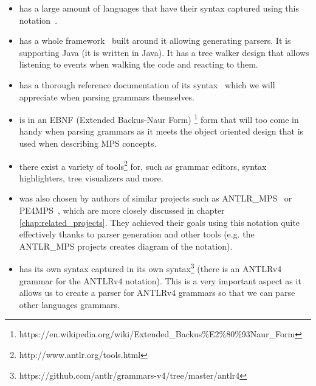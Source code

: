 \begin{itemize}
	\item has a large amount of languages that have their syntax captured using this notation~\cite{ANTLR4grammars}.

	\item has a whole framework~\cite{ANTLR4} built around it allowing generating parsers. It is supporting Java (it is written in Java). It has a tree walker design that allows listening to events when walking the code and reacting to them.

	\item has a thorough reference documentation of its syntax~\cite{ANTLR4reference} which we will appreciate when parsing grammars themselves.

	\item is in an EBNF (Extended Backus-Naur Form) \footnote{https://en.wikipedia.org/wiki/Extended{\_}Backus\%E2\%80\%93Naur{\_}Form} form that will too come in handy when parsing grammars as it meets the object oriented design that is used when describing MPS concepts.

	\item there exist a variety of tools\footnote{http://www.antlr.org/tools.html} for, such as grammar editors, syntax highlighters, tree visualizers and more.

	\item was also chosen by authors of similar projects such as ANTLR{\_}MPS~\cite{ANTLR2MPS} or PE4MPS~\cite{PE4MPS}, which are more closely discussed in chapter \ref{chap:related_projects}. They achieved their goals using this notation quite effectively thanks to parser generation and other tools (e.g. the ANTLR{\_}MPS projects creates diagram of the notation).

	\item has its own syntax captured in its own syntax\footnote{https://github.com/antlr/grammars-v4/tree/master/antlr4} (there is an ANTLRv4 grammar for the ANTLRv4 notation). This is a very important aspect as it allows us to create a parser for ANTLRv4 grammars so that we can parse other languages grammars.
\end{itemize}